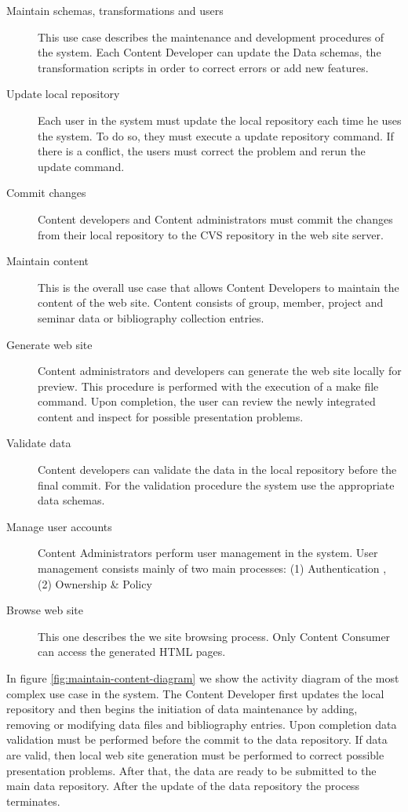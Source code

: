 \documentclass[10pt]{article}
\begin{document}
\begin{description}
\item[Maintain schemas, transformations and users] This use case describes the 
maintenance and development procedures of the system. Each Content Developer can
update the Data schemas, the transformation scripts in order to correct errors 
or add new features.

\item[Update local repository] Each user in the system must update the local 
repository each time he uses the system. To do so, they must execute a  update 
repository command. If there is a conflict, the users must correct the problem 
and rerun the update command.

\item[Commit changes] Content developers and Content administrators must commit 
the changes from their local repository to the {\sc CVS} repository in the web site server.

\item[Maintain content] This is the overall use case that allows Content 
Developers to maintain the content of the web site. 
Content consists of  group, member, project and seminar data or bibliography 
collection entries.

\item[Generate web site] Content administrators and developers can generate the 
web site locally for preview. This procedure is 
performed with the execution of a make file command. Upon completion, 
the user can review the newly integrated content and inspect 
for possible presentation problems.

\item[Validate data] Content developers can validate the data in the local 
repository before the final commit. For the validation procedure
the system use the appropriate data schemas.

\item[Manage user accounts] Content Administrators perform user management in the 
system. User management consists mainly of two main processes: 
(1) Authentication , (2) Ownership \& Policy

\item[Browse web site] This one describes the we site browsing process. Only 
Content Consumer can access the generated {\sc HTML} pages.

\end{description} 

In figure \ref{fig:maintain-content-diagram} we show the activity diagram of the 
most complex use case in the system. The Content Developer first updates the 
local repository and then begins the initiation of data maintenance by adding, 
removing or modifying data files and bibliography entries. Upon completion data 
validation must be performed before the commit to the data repository. If data 
are valid, then local web site generation must be performed to correct possible 
presentation problems. After that, the data are ready to be submitted to the main 
data repository. After the update of the data repository the process terminates.
\end{document}
